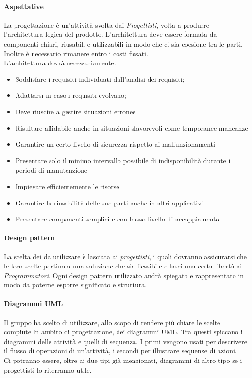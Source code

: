 \documentclass[../norme_di_progetto.tex]{subfiles}
\begin{document}
 \paragraph{Aspettative}
 La progettazione è un'attività svolta dai \emph{Progettisti}, volta a produrre l'architettura logica del prodotto. L'architettura deve essere formata da componenti chiari, riusabili e utilizzabili in modo che ci sia coesione tra le parti. Inoltre è necessario rimanere entro i costi fissati.\\
 L'architettura dovrà necessariamente: 
 \begin{itemize}
     \item Soddisfare i requisiti individuati dall'analisi dei requisiti;
     \item Adattarsi in caso i requisiti evolvano;
     \item Deve riuscire a gestire situazioni erronee
     \item Risultare affidabile anche in situazioni sfavorevoli come temporanee mancanze
     \item Garantire un certo livello di sicurezza rispetto ai malfunzionamenti
     \item Presentare solo il minimo intervallo possibile di indisponibilità durante i periodi di manutenzione
     \item Impiegare efficientemente le risorse
     \item Garantire la riusabilità delle sue parti anche in altri applicativi
     \item Presentare componenti semplici e con basso livello di accoppiamento
 \end{itemize}
 
 
 \paragraph{Design pattern}
 La scelta dei  da utilizzare è lasciata ai \emph{progettisti}, i quali dovranno assicurarsi che le loro scelte portino a una soluzione che sia flessibile e lasci una certa libertà ai \emph{Programmatori}. Ogni design pattern utilizzato andrà spiegato e rappresentato in modo da poterne esporre significato e struttura.
 
 \paragraph{Diagrammi UML}
 Il gruppo ha scelto di utilizzare, allo scopo di rendere più chiare le scelte compiute in ambito di progettazione, dei diagrammi UML. Tra questi spiccano i diagrammi delle attività e quelli di sequenza. I primi vengono usati per descrivere il flusso di operazioni di un'attività, i secondi per illustrare sequenze di azioni.\\
 Ci potranno essere, oltre ai due tipi già menzionati, diagrammi di altro tipo se i progettisti lo riterranno utile.
 
\end{document}
